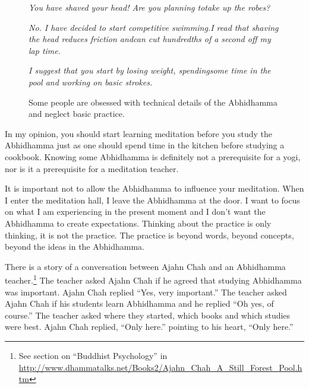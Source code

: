 \begin{figure}[H]
\begin{quoting}
\begin{flushleft}
\textit{You have shaved your head! Are you planning to\newline take up the robes?}
\end{flushleft}
\begin{flushright}
\textit{No. I have decided to start competitive swimming.\linebreak I read that shaving the head reduces friction and\linebreak can cut hundredths of a second off my lap time. }
\end{flushright}
\begin{flushleft}
\textit{I suggest that you start by losing weight, spending\newline some time in the pool and working on basic strokes.}
\end{flushleft}
\end{quoting}
\caption{Some people are obsessed with technical details of the Abhidhamma and neglect basic practice.}
\label{fig:Swimming}
\end{figure}

In my opinion, you should start learning meditation before you study the Abhidhamma just as one should spend time in the kitchen before studying a cookbook. Knowing some Abhidhamma is definitely not a prerequisite for a yogi, nor is it a prerequisite for a meditation teacher.

It is important not to allow the Abhidhamma to influence your meditation. When I enter the meditation hall, I leave the Abhidhamma at the door. I want to focus on what I am experiencing in the present moment and I don’t want the Abhidhamma to create expectations. Thinking about the practice is only thinking, it is not the practice. The practice is beyond words, beyond concepts, beyond the ideas in the Abhidhamma.

There is a story of a conversation between Ajahn Chah and an Abhidhamma teacher.\footnote{See section on “Buddhist Psychology” in \url{http://www.dhammatalks.net/Books2/Ajahn_Chah_A_Still_Forest_Pool.htm}} The teacher asked Ajahn Chah if he agreed that studying Abhidhamma was important. Ajahn Chah replied “Yes, very important.” The teacher asked Ajahn Chah if his students learn Abhidhamma and he replied “Oh yes, of course.” The teacher asked where they started, which books and which studies were best. Ajahn Chah replied, “Only here.” pointing to his heart, “Only here.”

